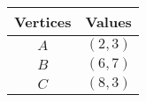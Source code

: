 \begin{tabular}[12pt]{ |c| c|}
    \hline
    \textbf{Vertices} & \textbf{Values}\\ 
    \hline
	$A$ & $(2,3)$ \\
    \hline 
	$B$ & $(6,7)$ \\
    \hline
	$C$ & $(8,3)$ \\
    \hline   
    \end{tabular}
